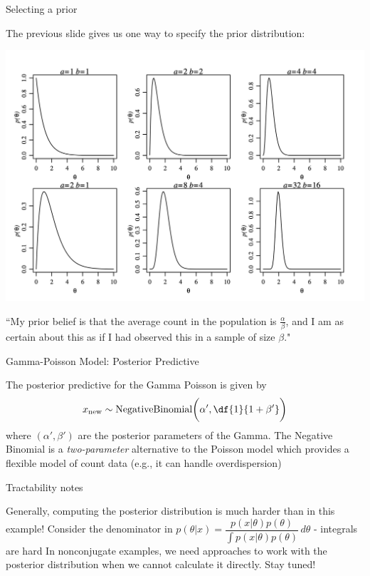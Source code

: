 \documentclass[10pt]{beamer}
\begin{document}
\begin{frame}{Selecting a prior}

The previous slide gives us one way to specify the prior distribution: 

\begin{center}
\includegraphics[width=.75\textwidth]{images/hoff_gamma}	
\end{center}

``My prior belief is that the average count in the population is $\frac{\alpha}{\beta}$, and I am as certain about this as if I had observed this in a sample of size $\beta$."
\end{frame}

\begin{frame}{Gamma-Poisson Model: Posterior Predictive}

The posterior predictive for the Gamma Poisson is given by 
\[ x_{\text{new}} \sim \text{NegativeBinomial}\bigg(\alpha', \df{1}{1+\beta'} \bigg) \]	
where $(\alpha', \beta')$ are the posterior parameters of the Gamma.
\vfill 
The Negative Binomial is a \textit{two-parameter} alternative to the Poisson model which provides a flexible model of count data {\tiny (e.g., it can handle overdispersion)} 
\end{frame}







\begin{frame}{Tractability notes}

Generally, computing the posterior distribution is much harder than in this example!
\vfill
Consider the denominator in $ p(\theta | x) = \dfrac{p(x | \theta) p(\theta)}{\int p(x | \theta) p(\theta)} \, d\theta $  - integrals are hard 
\vfill
In nonconjugate examples, we need approaches to work with the posterior distribution when we cannot calculate it directly. Stay tuned!

\end{frame}
\end{document}
